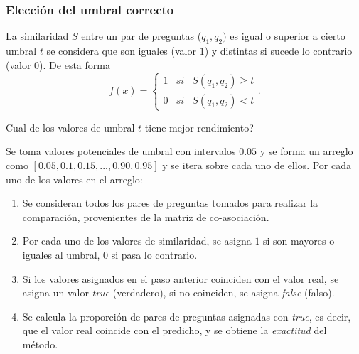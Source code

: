 \begin{frame}[allowframebreaks]
	\frametitle{Elección del umbral correcto}
	La similaridad \(S\) entre un par de preguntas (\(q_1,q_2)\) es igual o superior a cierto umbral \(t\) se considera que son iguales (valor \(1\)) y distintas si sucede lo contrario (valor \(0\)). De esta forma
	\[f(x) = \left\{ \begin{array}{lcc} 1 & si & S(q_1, q_2)\geq t
		\\ 0 & si & S(q_1, q_2) < t
	\end{array} \right..\]

	\begin{center}
		\centering	Cual de los valores de umbral \(t\) tiene mejor rendimiento?
	\end{center}

	\framebreak

	Se toma valores potenciales de umbral con intervalos \(0.05\) y se forma un arreglo como \textbf{\([0.05, 0.1, 0.15, ..., 0.90, 0.95]\)} y se itera sobre cada uno de ellos. Por cada uno de los valores en el arreglo:
	\begin{enumerate}[<*>]
		\item Se consideran todos los pares de preguntas tomados para realizar la comparación, provenientes de la matriz de co-asociación.
		\item Por cada uno de los valores de similaridad, se asigna \(1\) si son mayores o iguales al umbral, \(0\) si pasa lo contrario.
		\item Si los valores asignados en el paso anterior coinciden con el valor real, se asigna un valor \textit{true} (verdadero), si no coinciden, se asigna \textit{false} (falso).
		\item Se calcula la proporción de pares de preguntas asignadas con \textit{true}, es decir, que el valor real coincide con el predicho, y se obtiene la \textit{exactitud} del método.
	\end{enumerate}

	\framebreak


\end{frame}

